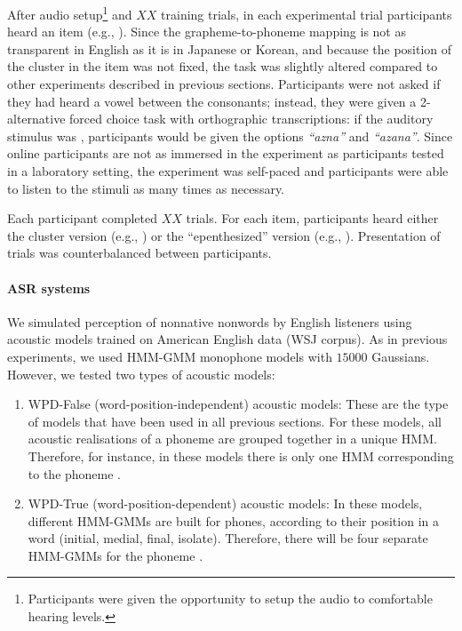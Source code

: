 {After audio setup\footnote{Participants were given the opportunity to setup the audio to comfortable hearing levels.} and {\color{red}$XX$} training trials, in each experimental trial participants heard an item (e.g., ). Since the grapheme-to-phoneme mapping is not as transparent in English as it is in Japanese or Korean, and because the position of the cluster in the item was not fixed, the task was slightly altered compared to other experiments described in previous sections. Participants were not asked if they had heard a vowel between the consonants; instead, they were given a 2-alternative forced choice task with orthographic transcriptions: if the auditory stimulus was , participants would be given the options \textit{``azna''} and  \textit{``azana''}. Since online participants are not as immersed in the experiment as participants tested in a laboratory setting, the experiment was self-paced and participants were able to listen to the stimuli as many times as necessary.

Each participant completed {\color{red}$XX$} trials. For each item, participants heard either the cluster version (e.g., ) or the ``epenthesized'' version (e.g., ). Presentation of trials was counterbalanced between participants.   


\paragraph{ASR systems}
We simulated perception of nonnative nonwords by English listeners using acoustic models trained on American English data (WSJ corpus). As in previous experiments, we used HMM-GMM monophone models with $15000$ Gaussians. However, we tested two types of acoustic models:

\begin{enumerate}
\item WPD-False (word-position-independent) acoustic models: These are the type of models that have been used in all previous sections. For these models, all acoustic realisations of a phoneme are grouped together in a unique HMM. Therefore, for instance, in these models there is only one HMM corresponding to the phoneme .
  \item WPD-True (word-position-dependent) acoustic models: In these models, different HMM-GMMs are built for phones, according to their position in a word (initial, medial, final, isolate). Therefore, there will be four separate HMM-GMMs for the phoneme .  
\end{enumerate}

}
